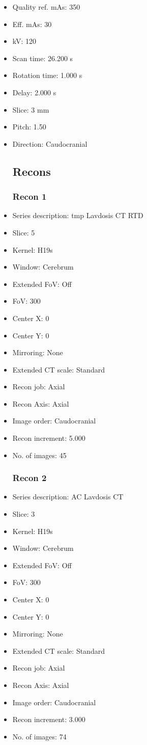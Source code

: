 \documentclass[12pt]{article}
\begin{document}
\begin{itemize}
\subsection{Scan}
\item Quality ref. mAs: 350\item Eff. mAs: 30\item kV: 120\item Scan time: 26.200 s\item Rotation time: 1.000 s\item Delay: 2.000 s\item Slice: 3 mm\item Pitch: 1.50\item Direction: Caudocranial\subsection{Recons}

\subsubsection{Recon 1}
\item Series description: tmp Lavdosis CT RTD
\item Slice: 5
\item Kernel: H19s
\item Window: Cerebrum
\item Extended FoV: Off
\item FoV: 300
\item Center X: 0
\item Center Y: 0
\item Mirroring: None
\item Extended CT scale: Standard
\item Recon job: Axial
\item Recon Axis: Axial
\item Image order: Caudocranial
\item Recon increment: 5.000
\item No. of images: 45
\subsubsection{Recon 2}
\item Series description: AC Lavdosis CT
\item Slice: 3
\item Kernel: H19s
\item Window: Cerebrum
\item Extended FoV: Off
\item FoV: 300
\item Center X: 0
\item Center Y: 0
\item Mirroring: None
\item Extended CT scale: Standard
\item Recon job: Axial
\item Recon Axis: Axial
\item Image order: Caudocranial
\item Recon increment: 3.000
\item No. of images: 74

\end{itemize}
\end{document}
